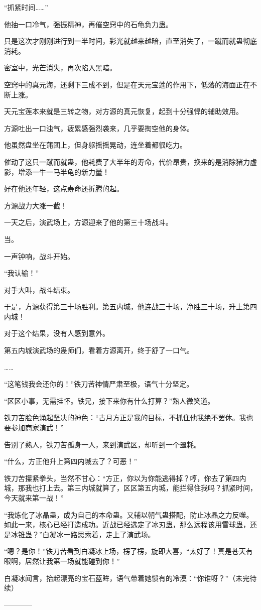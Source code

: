 \begin{this_body}
“抓紧时间……”

他抽一口冷气，强振精神，再催空窍中的石龟负力蛊。

只是这次才刚刚进行到一半时间，彩光就越来越暗，直至消失了，一蹴而就蛊彻底消耗。

密室中，光芒消失，再次陷入黑暗。

空窍中的真元海，还剩下三成不到，但是在天元宝莲的作用下，低落的海面正在不断上涨。

天元宝莲本来就是三转之物，对方源的真元恢复，起到十分强悍的辅助效用。

方源吐出一口浊气，疲累感强烈袭来，几乎要掏空他的身体。

他虽然盘坐在蒲团上，但身躯摇摇晃动，连坐着都很吃力。

催动了这只一蹴而就蛊，他耗费了大半年的寿命，代价昂贵，换来的是消除猪力虚影，增添一牛一马半龟的新力量！

好在他还年轻，这点寿命还折腾的起。

方源战力大涨一截！

一天之后，演武场上，方源迎来了他的第三十场战斗。

当。

一声钟响，战斗开始。

“我认输！”

对手大叫，战斗结束。

于是，方源获得第三十场胜利。第五内城，他连战三十场，净胜三十场，升上第四内城！

对于这个结果，没有人感到意外。

第五内城演武场的蛊师们，看着方源离开，终于舒了一口气。

……

“这笔钱我会还你的！”铁刀苦神情严肃至极，语气十分坚定。

“区区小事，无需挂怀。铁兄，接下来你有什么打算？”熟人微笑道。

铁刀苦脸色涌起坚决的神色：“古月方正是我的目标，不抓住他我绝不罢休。我也要参加商家演武！”

告别了熟人，铁刀苦孤身一人，来到演武区，却听到一个噩耗。

“什么，方正他升上第四内城去了？可恶！”

铁刀苦攥紧拳头，当然不甘心：“方正，你以为你能逃得掉？哼，你去了第四内城，那我也打上去。第三内城就算了，区区第五内城，能拦得住我吗？抓紧时间，今天就来第一战！”

“我炼化了冰晶蛊，成为自己的本命蛊。又辅以朝气蛊搭配，防止冰晶之力反噬。如此一来，核心已经打造成功。近战已经选定了冰刃蛊，那么远程该用雪球蛊，还是冰锥蛊？”白凝冰一路思索着，走上了演武场。

“嗯？是你！”铁刀苦看到白凝冰上场，楞了楞，旋即大喜，“太好了！真是苍天有眼啊，居然让我第一场就能碰到你！”

白凝冰闻言，抬起漂亮的宝石蓝眸，语气带着她惯有的冷漠：“你谁呀？”（未完待续）

------------

\end{this_body}

